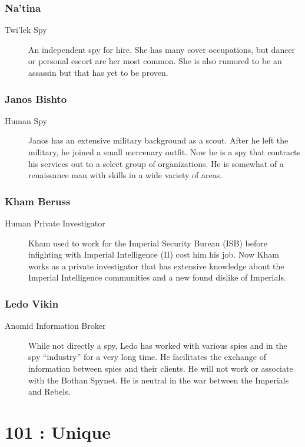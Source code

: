 \documentclass{article}
\begin{document}
\section{Na’tina}
\begin{description}
	\item [Twi’lek \female Spy] An independent spy for hire. She has many cover occupations, but dancer or personal escort are her most common. She is also rumored to be an assassin but that has yet to be proven.
\end{description}
\section{Janos Bishto}
\begin{description}
	\item [Human \male Spy] Janos has an extensive military background as a scout. After he left the military, he joined a small mercenary outfit. Now he is a spy that contracts his services out to a select group of organizations. He is somewhat of a renaissance man with skills in a wide variety of areas.
\end{description}
\section{Kham Beruss}
\begin{description}
	\item [Human \male Private Investigator] Kham used to work for the Imperial Security Bureau (ISB) before infighting with Imperial Intelligence (II) cost him his job. Now Kham works as a private investigator that has extensive knowledge about the Imperial Intelligence communities and a new found dislike of Imperials.
\end{description}
\section{Ledo Vikin}
\begin{description}
	\item [Anomid \male Information Broker] While not directly a spy, Ledo has worked with various spies and in the spy “industry” for a very long time. He facilitates the exchange of information between spies and their clients. He will not work or associate with the Bothan Spynet. He is neutral in the war between the Imperials and Rebels.
\end{description}

\part*{101 : Unique}
\setcounter{section}{100}
\end{document}
